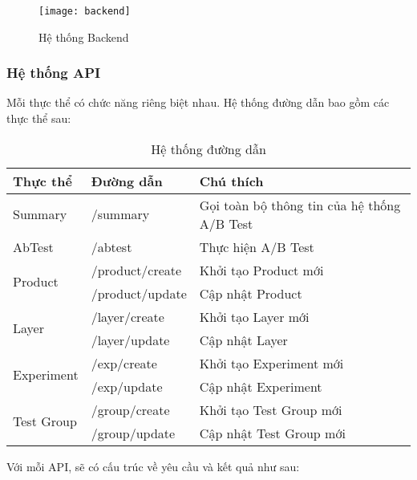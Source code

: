 \begin{figure}[H]
	\centering
	\texttt{[image: backend]}
	\caption{Hệ thống Backend}
\end{figure}

\subsubsection{Hệ thống API}

Mỗi thực thể có chức năng riêng biệt nhau. Hệ thống đường dẫn bao gồm các thực thể sau:

\begin{table}[H]
	\centering
	\begin{tabular}{|l|l|l|}
		\hline
		\textbf{Thực thể}           & \textbf{Đường dẫn} & \textbf{Chú thích}                          \\ \hline
		Summary                     & /summary           & Gọi toàn bộ thông tin của hệ thống A/B Test \\ \hline
		AbTest                      & /abtest            & Thực hiện A/B Test                          \\ \hline
		\multirow{2}{*}{Product}    & /product/create    & Khởi tạo Product mới                        \\ \cline{2-3}
		                            & /product/update    & Cập nhật Product                            \\ \hline
		\multirow{2}{*}{Layer}      & /layer/create      & Khởi tạo Layer mới                          \\ \cline{2-3}
		                            & /layer/update      & Cập nhật Layer                              \\ \hline
		\multirow{2}{*}{Experiment} & /exp/create        & Khởi tạo Experiment mới                     \\ \cline{2-3}
		                            & /exp/update        & Cập nhật Experiment                         \\ \hline
		\multirow{2}{*}{Test Group} & /group/create      & Khởi tạo Test Group mới                     \\ \cline{2-3}
		                            & /group/update      & Cập nhật Test Group mới                     \\ \hline
	\end{tabular}
	\caption{Hệ thống đường dẫn}
\end{table}

Với mỗi API, sẽ có cấu trúc về yêu cầu và kết quả như sau:

